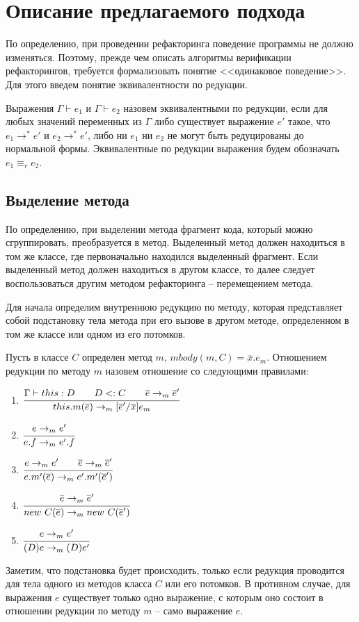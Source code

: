 \chapter{Описание предлагаемого подхода}

По определению, при проведении рефакторинга поведение программы не должно изменяться.
Поэтому, прежде чем описать алгоритмы верификации рефакторингов, требуется формализовать понятие <<одинаковое поведение>>.
Для этого введем понятие эквивалентности по редукции.
\begin{definition}
Выражения $\Gamma \vdash e_1$ и $\Gamma \vdash e_2$ назовем эквивалентными по редукции,
если для любых значений переменных из $\Gamma$ либо существует выражение $e'$ такое, что $e_1 \rightarrow^* e'$ и $e_2 \rightarrow^* e'$,
либо ни $e_1$ ни $e_2$ не могут быть редуцированы до нормальной формы.
Эквивалентные по редукции выражения будем обозначать $e_1 \equiv_r e_2$.
\end{definition}

\section{Выделение метода}

По определению, при выделении метода фрагмент кода, который можно сгруппировать, преобразуется в метод.
Выделенный метод должен находиться в том же классе, где первоначально находился выделенный фрагмент.
Если выделенный метод должен находиться в другом классе, то далее следует воспользоваться
другим методом рефакторинга -- перемещением метода.

Для начала определим внутреннюю редукцию по методу,
которая представляет собой подстановку тела метода при его вызове в другом методе,
определенном в том же классе или одном из его потомков.
\begin{definition}
Пусть в классе $C$ определен метод $m$, $mbody(m, C) = \overline{x}.e_m$.
Отношением редукции по методу $m$ назовем отношение со следующими правилами:
\begin{enumerate}
    \item $\cfrac{\Gamma \vdash this : D \qquad D <: C \qquad \overline{e} \rightarrow_m \overline{e}'}{this.m(\overline{e}) \rightarrow_m [\overline{e}'/\overline{x}]e_m}$
    \item $\cfrac{e \rightarrow_m e'}{e.f \rightarrow_m e'.f}$
    \item $\cfrac{e \rightarrow_m e' \qquad \overline{e} \rightarrow_m \overline{e}'}{e.m'(\overline{e}) \rightarrow_m e'.m'(\overline{e}')}$
    \item $\cfrac{\overline{e} \rightarrow_m \overline{e}'}{new\ C(\overline{e}) \rightarrow_m new\ C(\overline{e}')}$
    \item $\cfrac{e \rightarrow_m e'}{(D)e \rightarrow_m (D)e'}$
\end{enumerate}
\end{definition}
Заметим, что подстановка будет происходить, только если редукция проводится для тела одного из методов класса $C$ или его потомков.
В противном случае, для выражения $e$ существует только одно выражение, с которым оно состоит в отношении редукции по методу $m$ -- само выражение $e$.

